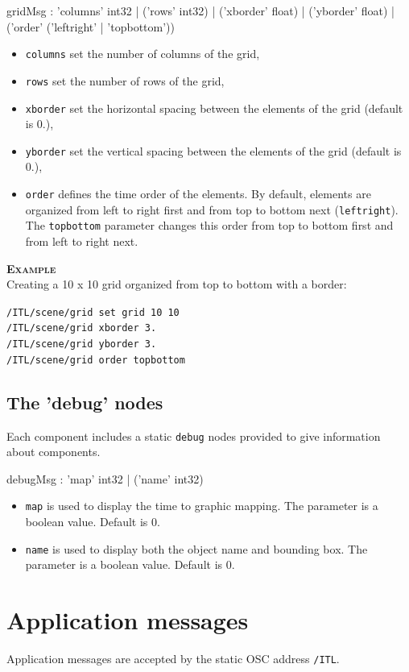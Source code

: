 \documentclass[a4paper,twoside]{report}
\newcommand{\toplevel}[1]	{\chapter{#1}}
\newcommand{\sublevel}[1]	{\section{#1}}
\newcommand{\OSC}[1]		{\texttt{#1}}
\newcommand{\example}		{\textbf{\hspace{-1.5cm}\textbf{\textsc{Example }}}}
\newcommand{\sample}	[1]			{\vspace{-2mm}\begin{center}\colorbox{mygrey}{
								\begin{minipage}[t]{0.9\columnwidth} 
								{\small \texttt{#1}}
								\end{minipage}}\end{center}}
\begin{document}
\begin{rail}
gridMsg : 'columns' int32
		| ('rows' int32) 
		| ('xborder' float)
		| ('yborder' float)
		| ('order' ('leftright' | 'topbottom'))
\end{rail}

\begin{itemize}
\item \OSC{columns} set the number of columns of the grid,
\item \OSC{rows} set the number of rows of the grid,
\item \OSC{xborder} set the horizontal spacing between the elements of the grid (default is 0.),
\item \OSC{yborder} set the vertical spacing between the elements of the grid (default is 0.),
\item \OSC{order} defines the time order of the elements. By default, elements are organized from left to right first and from top to bottom next (\OSC{leftright}). The \OSC{topbottom} parameter changes this order from top to bottom first and from left to right next.
\end{itemize}

\example \\
Creating a 10 x 10 grid organized from top to bottom with a border:
\sample{/ITL/scene/grid set grid 10 10\\
/ITL/scene/grid xborder 3. \\
/ITL/scene/grid yborder 3. \\
/ITL/scene/grid order topbottom
}

\sublevel{The 'debug' nodes}
\label{debugnode}

Each component includes a static \OSC{debug} nodes provided to give information about components.
\begin{rail}
debugMsg : 'map' int32
		| ('name' int32) 
\end{rail}

\begin{itemize}
\item \OSC{map} is used to display the time to graphic mapping. The parameter is a boolean value. Default is 0.
\item \OSC{name} is used to display both the object name and bounding box. The parameter is a boolean value. Default is 0.
\end{itemize}


\toplevel{Application messages}
\label{ITL}
Application messages are accepted by the static OSC address \OSC{/ITL}. 
\end{document}
